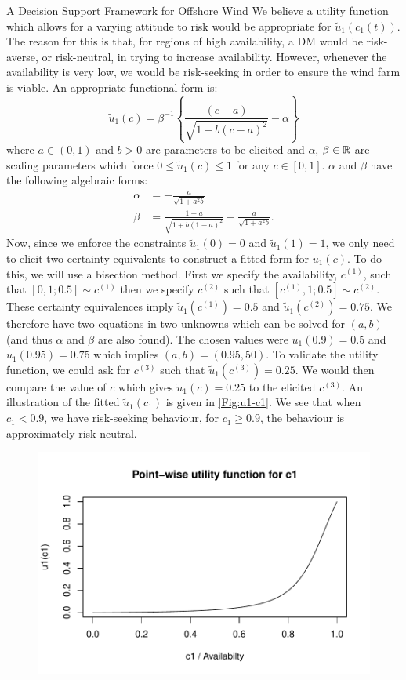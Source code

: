 \begin{chapter}{A Decision Support Framework for Offshore Wind \label{Ch:ds-for-ow}}
We believe a utility function which allows for a varying attitude to risk would be appropriate for $\tilde{u}_1(c_1(t))$. The reason for this is that, for regions of high availability, a DM would be risk-averse, or risk-neutral, in trying to increase availability. However, whenever the availability is very low, we would be risk-seeking in order to ensure the wind farm is viable. An appropriate functional form is:
\begin{equation}
 \tilde{u}_{1}(c) = \beta^{-1} \left\{\frac{(c - a)}{\sqrt{1 + b (c-a)^2}} - \alpha\right\}
\end{equation}
where $a \in (0,1)$ and $b>0$ are parameters to be elicited and $\alpha$, $\beta \in \mathbb{R}$ are scaling parameters which force $0 \leq \tilde{u}_{1}(c) \leq 1$ for any $c \in [0,1]$. $\alpha$ and $\beta$ have the following algebraic forms:
\begin{align}
 \alpha &= -\frac{a}{\sqrt{1 + a^2b}}\\
 \beta &= \frac{1 - a}{\sqrt{1 + b(1-a)^2}} -\frac{a}{\sqrt{1 + a^2b}}.
\end{align}
Now, since we enforce the constraints $\tilde{u}_1(0) = 0$ and $\tilde{u}_1(1) = 1$, we only need to elicit two certainty equivalents to construct a fitted form for $u_1(c)$. To do this, we will use a bisection method. First we specify the availability, $c^{(1)}$, such that $[0, 1; 0.5] \sim c^{(1)}$ then we specify $c^{(2)}$ such that $[c^{(1)}, 1; 0.5] \sim c^{(2)}$. These certainty equivalences imply $\tilde{u}_1(c^{(1)}) = 0.5$ and $\tilde{u}_1(c^{(2)}) = 0.75$. We therefore have two equations in two unknowns which can be solved for $(a , b)$ (and thus $\alpha$ and $\beta$ are also found). The chosen values were $u_1(0.9)= 0.5$ and $u_1(0.95) = 0.75$ which implies $(a, b) = (0.95, 50)$. To validate the utility function, we could ask for $c^{(3)}$ such that $\tilde{u}_1(c^{(3)}) = 0.25$. We would then compare the value of $c$ which gives $\tilde{u}_1(c) = 0.25$ to the elicited $c^{(3)}$. An illustration of the fitted $\tilde{u}_1(c_1)$ is given in \cref{Fig:u1-c1}. We see that when $c_1 < 0.9$, we have risk-seeking behaviour, for $c_1 \geq 0.9$, the behaviour is approximately risk-neutral.
\begin{figure}
 \centering
 \includegraphics{fig-ds/u1-c1.pdf}

\end{figure}
\end{chapter}
